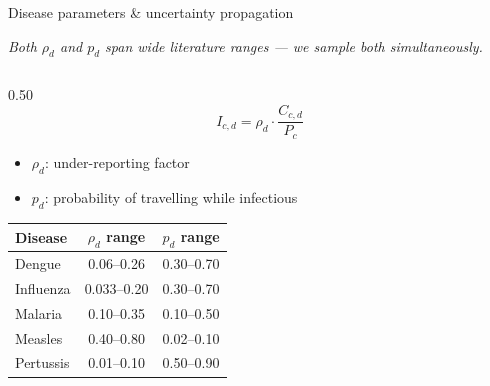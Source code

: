 \documentclass[aspectratio=169, 11pt]{beamer}
\begin{document}
\begin{frame}{Disease parameters \& uncertainty propagation}

  \begin{center}
  \small\textit{Both $\rho_d$ and $p_d$ span wide literature ranges — we sample both simultaneously.}
  \end{center}

  \vspace{0.2em}

  \begin{columns}[T]

    \begin{column}{0.50\textwidth}
      \footnotesize
      \[
        I_{c,d} = \rho_d \cdot \frac{C_{c,d}}{P_c}
      \]
      \vspace{-0.8em}
      \begin{itemize}
        \item $\rho_d$: under-reporting factor
        \item $p_d$: probability of travelling while infectious
      \end{itemize}
      \vspace{0.4em}
      \begin{tabular}{lcc}
        \toprule
        \textbf{Disease} & \textbf{$\rho_d$ range} & \textbf{$p_d$ range} \\
        \midrule
        Dengue    & 0.06--0.26  & 0.30--0.70 \\
        Influenza & 0.033--0.20 & 0.30--0.70 \\
        Malaria   & 0.10--0.35  & 0.10--0.50 \\
        Measles   & 0.40--0.80  & 0.02--0.10 \\
        Pertussis & 0.01--0.10  & 0.50--0.90 \\
        \bottomrule
      \end{tabular}
    \end{column}


\end{columns}
\end{frame}
\end{document}
